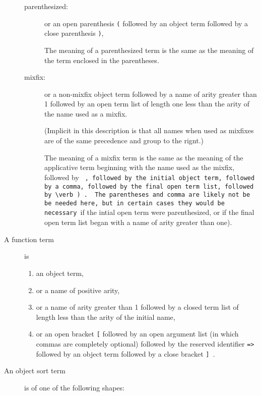 \documentclass[12pt]{article}
\begin{document}
\begin{description}
\begin{description}
\item[parenthesized:]   or an open parenthesis \verb|(|  followed by an object term followed by a close parenthesis \verb|)|, 

The meaning of a parenthesized term is the same as the meaning of the term enclosed in the parentheses.

\item[mixfix:]   or a non-mixfix object term followed by a name of arity greater than 1 followed by an open term list of length one less than the arity of the name used as a mixfix.

(Implicit in this description is that all names when used as mixfixes are of the same precedence and group to the rignt.)

The meaning of a mixfix term is the same as the meaning of the applicative term beginning with the name used as the mixfix, followed by \verb ( , followed by the initial object term, followed by a comma, followed by the final open term list, followed by \verb ) .  The parentheses and comma are likely not be be needed here, but in certain cases they would be necessary (if the intial open term were parenthesized, or if the final open term list began with a name of arity greater than one).

\end{description}

\item [A function term] is 

\begin{enumerate}

\item an object term, 

\item or a name of positive arity, 

\item or a name of arity greater than 1 followed by a closed term list of length less than the arity of the initial name, 

\item or
an open bracket \verb|[| followed by an open argument list (in which commas are completely optional) followed by the reserved identifier {\tt =>} followed by an object term followed by a close bracket \verb|] |.

\end{enumerate}



\item [An object sort term] is of one of the following shapes:


\end{description}
\end{document}
